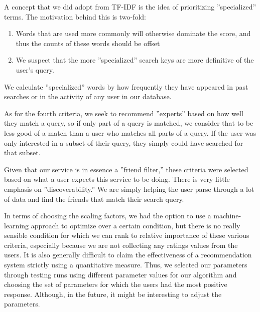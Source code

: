 A concept that we did adopt from TF-IDF is the idea of prioritizing ''specialized'' terms. The motivation behind this is two-fold:
\begin{enumerate}
\item Words that are used more commonly will otherwise dominate the score, and thus the counts of these words should be offset
\item We suspect that the more ''specialized'' search keys are more definitive of the user's query.
\end{enumerate}

We calculate ''specialized'' words by how frequently they have appeared in past searches or in the activity of any user in our database.

As for the fourth criteria, we seek to recommend ''experts'' based on how well they match a query, so if only part of a query is matched, we consider that to be less good of a match than a user who matches all parts of a query. If the user was only interested in a subset of their query, they simply could have searched for that subset.

Given that our service is in essence a ''friend filter,'' these criteria were selected based on what a user expects this service to be doing. There is very little emphasis on ''discoverability.'' We are simply helping the user parse through a lot of data and find the friends that match their search query.

In terms of choosing the scaling factors, we had the option to use a machine-learning approach to optimize over a certain condition, but there is no really sensible condition for which we can rank to relative importance of these various criteria, especially because we are not collecting any ratings values from the users. It is also generally difficult to claim the effectiveness of a recommendation system strictly using a quantitative measure. Thus, we selected our parameters through testing runs using different parameter values for our algorithm and choosing the set of parameters for which the users had the most positive response. Although, in the future, it might be interesting to adjust the parameters.




